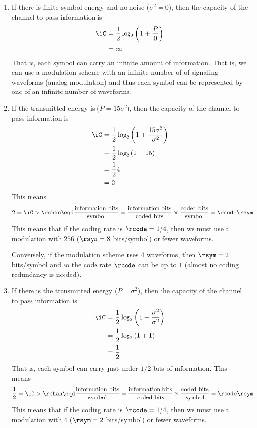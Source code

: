 {\begin{example}
\begin{enumerate}
  \item If there is finite symbol energy and no noise ($\sigma^2=0$),
        then the capacity of the channel to pass information is
    \begin{align*}
      \iC
        &= \frac{1}{2}\log_2\left( 1 + \frac{P}{0}\right)
      \\&= \infty
    \end{align*}
  That is, each symbol can carry an infinite amount of information.
  That is, we can use a modulation scheme with an infinite
  number of of signaling waveforms (analog modulation)
  and thus each symbol can be represented by one of an
  infinite number of waveforms.

  \item If the transmitted energy is ($P=15\sigma^2$),
        then the capacity of the channel to pass information is
    \begin{align*}
      \iC
        &= \frac{1}{2}\log_2\left( 1 + \frac{15\sigma^2}{\sigma^2}\right)
      \\&= \frac{1}{2}\log_2\left( 1 + 15\right)
      \\&= \frac{1}{2} 4
      \\&= 2
    \end{align*}
  This means
  \begin{align*}
    2
      &= \iC
       >  \rchan
       \eqd \frac{\mbox{information bits}}{\mbox{symbol}}
       = \frac{\mbox{information bits}}{\mbox{coded bits}} \times
         \frac{\mbox{coded bits}}{\mbox{symbol}}
       = \rcode \rsym
  \end{align*}
  This means that if the coding rate is $\rcode=1/4$,
  then we must use a modulation with $256$ ($\rsym=8$ bits/symbol)
  or fewer waveforms.

  Conversely, if the modulation scheme uses $4$ waveforms, then
  $\rsym=2$ bits/symbol and so the code rate $\rcode$ can be
  up to $1$ (almost no coding redundancy is needed).


  \item If there is the transmitted energy ($P=\sigma^2$),
        then the capacity of the channel to pass information is
    \begin{align*}
      \iC
        &= \frac{1}{2}\log_2\left( 1 + \frac{\sigma^2}{\sigma^2}\right)
      \\&= \frac{1}{2}\log_2\left( 1 + 1\right)
      \\&= \frac{1}{2}
    \end{align*}
  That is, each symbol can carry just under $1/2$ bits of information.
  This means
  \begin{align*}
    \frac{1}{2}
      &= \iC
       >  \rchan
       \eqd \frac{\mbox{information bits}}{\mbox{symbol}}
       = \frac{\mbox{information bits}}{\mbox{coded bits}} \times
         \frac{\mbox{coded bits}}{\mbox{symbol}}
       = \rcode \rsym
  \end{align*}
  This means that if the coding rate is $\rcode=1/4$,
  then we must use a modulation with $4$ ($\rsym=2$ bits/symbol)
  or fewer waveforms.


\end{enumerate}
\end{example}}

